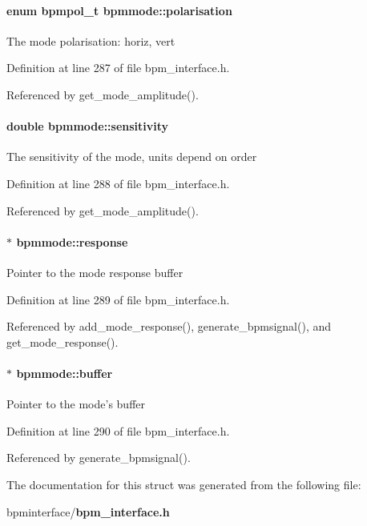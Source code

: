 \paragraph[polarisation]{\setlength{\rightskip}{0pt plus 5cm}enum {\bf bpmpol\_\-t} {\bf bpmmode::polarisation}}\hfill\label{structbpmmode_72e607b92a918c1294d30523b39cff5b}


The mode polarisation: horiz, vert 

Definition at line 287 of file bpm\_\-interface.h.

Referenced by get\_\-mode\_\-amplitude().
\paragraph[sensitivity]{\setlength{\rightskip}{0pt plus 5cm}double {\bf bpmmode::sensitivity}}\hfill\label{structbpmmode_9e0125d3567d1be32ce516fddf432e04}


The sensitivity of the mode, units depend on order 

Definition at line 288 of file bpm\_\-interface.h.

Referenced by get\_\-mode\_\-amplitude().
\paragraph[response]{$\ast$ {\bf bpmmode::response}}\hfill\label{structbpmmode_52fbf2f821be6d800fc5937f38c0e04f}


Pointer to the mode response buffer 

Definition at line 289 of file bpm\_\-interface.h.

Referenced by add\_\-mode\_\-response(), generate\_\-bpmsignal(), and get\_\-mode\_\-response().
\paragraph[buffer]{$\ast$ {\bf bpmmode::buffer}}\hfill\label{structbpmmode_64d7f14461813e77f2819be9b593cbcc}


Pointer to the mode's buffer 

Definition at line 290 of file bpm\_\-interface.h.

Referenced by generate\_\-bpmsignal().

The documentation for this struct was generated from the following file:\begin{CompactItemize}
\item 
bpminterface/{\bf bpm\_\-interface.h}\end{CompactItemize}
